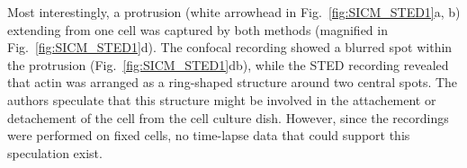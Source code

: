 Most interestingly, a protrusion (white arrowhead in
Fig.~\ref{fig:SICM_STED1}a, b) extending from one cell was captured by both
methods (magnified in Fig.~\ref{fig:SICM_STED1}d). The confocal recording
showed a blurred spot within the protrusion (Fig.~\ref{fig:SICM_STED1}db),
while the STED recording revealed that actin was arranged as a ring-shaped
structure around two central spots. The authors speculate that this structure
might be involved in the attachement or detachement of the cell from the cell
culture dish. However, since the recordings were performed on fixed cells, no
time-lapse data that could support this speculation exist.




